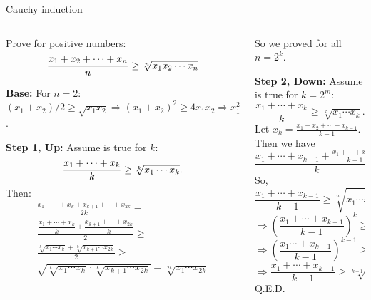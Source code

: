 \documentclass[9pt,aspectratio=169]{beamer}
\begin{document}
\begin{frame}{Cauchy induction}
  \begin{columns}[T]
    \begin{column}{0.5\textwidth}
      \begin{problem}
        Prove for positive numbers:
        \[ \frac{x_1 + x_2 + \cdots + x_n}{n} \geq \sqrt[n]{x_1 x_2 \cdots x_n}
        \vspace*{-5px}
        \]
      \end{problem}\pause

      \textbf{Base:} For $n=2$: $(x_1 + x_2)/2 \geq \sqrt{x_1 x_2} \Rightarrow (x_1 + x_2)^2 \geq 4 x_1 x_2 \Rightarrow x_1^2 - 2x_1 x_2 + x_2^2 \geq 0 \Rightarrow (x_1 - x_2)^2 \geq 0$.\pause

      \smallskip
      \textbf{Step 1, Up:} Assume is true for $k$:
      \[ \frac{x_1 + \cdots + x_k}{k} \geq \sqrt[k]{x_1 \cdots x_k}.
      \vspace*{-5px}
      \]\pause
      Then:
      \begin{multline*}
        \frac{x_1 + \cdots + x_k + x_{k+1} + \cdots + x_{2k}}{2k} = \\
        \frac{\dfrac{x_1 + \cdots + x_k}{k} + \dfrac{x_{k+1} + \cdots + x_{2k}}{k}}{2} \geq \\
        \frac{\sqrt[k]{x_1 \cdots x_k} + \sqrt[k]{x_{k+1} \cdots x_{2k}}}{2} \geq \\
        \sqrt{\sqrt[k]{x_1 \cdots x_k} \cdot \sqrt[k]{x_{k+1} \cdots x_{2k}}} = 
        \sqrt[2k] {x_1 \cdots x_{2k}}
      \end{multline*}\pause
    \end{column}
    \begin{column}{0.5\textwidth}
      So we proved for all $n = 2^k$.\pause
      
      \textbf{Step 2, Down:} Assume is true for $k = 2^m$:
      \[ \frac{x_1 + \cdots + x_k}{k} \geq \sqrt[k]{x_1 \cdots x_k}.
      \]\pause
      Let $x_k=\frac{x_1+x_2+\cdots+x_{k-1}}{k-1}$. \pause
      Then we have
      \[
        \frac{x_1+\cdots+x_{k-1}+\frac{x_1+\cdots+x_{k-1}}{k-1}}{k}=
        \frac{x_1+\cdots+x_{k-1}}{k-1}
      \]\pause
      So,
      \[
        \frac{x_1+\cdots+x_{k-1}}{k-1}\ge \sqrt[n]{x_1\cdots x_{k-1}\cdot \frac{x_1+\cdots+x_{k-1}}{k-1}}
      \]
      \[\Rightarrow\left(\frac{x_1+\cdots+x_{k-1}}{k-1}\right)^k\ge x_1\cdots x_{k-1}\cdot \frac{x_1+\cdots+x_{k-1}}{k-1}\]
      \[\Rightarrow\left(\frac{x_1\cdots+x_{k-1}}{k-1}\right)^{k-1}\ge x_1\cdots x_{k-1}\]
      \[\Rightarrow \frac{x_1+\cdots+x_{k-1}}{k-1}\ge\sqrt[k-1]{x_1\cdots x_{k-1}}\]\pause
      \hfill Q.E.D.
    \end{column}
  \end{columns}
\end{frame}
\end{document}
